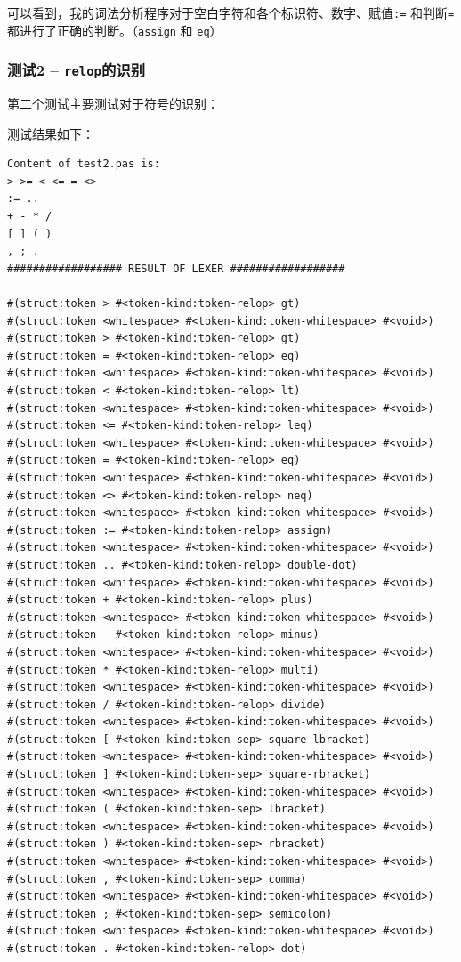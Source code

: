 \documentclass[lang=cn]{elegantpaper}
\begin{document}
可以看到，我的词法分析程序对于空白字符和各个标识符、数字、赋值\lstinline|:=|
和判断\lstinline|=|都进行了正确的判断。（\lstinline|assign| 和 
\lstinline|eq|）

\subsubsection{测试2 -- \lstinline|relop|的识别}

第二个测试主要测试对于符号的识别：



测试结果如下：

\begin{lstlisting}
Content of test2.pas is:
> >= < <= = <> 
:= ..
+ - * /
[ ] ( )
, ; .
################## RESULT OF LEXER ##################

#(struct:token > #<token-kind:token-relop> gt)
#(struct:token <whitespace> #<token-kind:token-whitespace> #<void>)
#(struct:token > #<token-kind:token-relop> gt)
#(struct:token = #<token-kind:token-relop> eq)
#(struct:token <whitespace> #<token-kind:token-whitespace> #<void>)
#(struct:token < #<token-kind:token-relop> lt)
#(struct:token <whitespace> #<token-kind:token-whitespace> #<void>)
#(struct:token <= #<token-kind:token-relop> leq)
#(struct:token <whitespace> #<token-kind:token-whitespace> #<void>)
#(struct:token = #<token-kind:token-relop> eq)
#(struct:token <whitespace> #<token-kind:token-whitespace> #<void>)
#(struct:token <> #<token-kind:token-relop> neq)
#(struct:token <whitespace> #<token-kind:token-whitespace> #<void>)
#(struct:token := #<token-kind:token-relop> assign)
#(struct:token <whitespace> #<token-kind:token-whitespace> #<void>)
#(struct:token .. #<token-kind:token-relop> double-dot)
#(struct:token <whitespace> #<token-kind:token-whitespace> #<void>)
#(struct:token + #<token-kind:token-relop> plus)
#(struct:token <whitespace> #<token-kind:token-whitespace> #<void>)
#(struct:token - #<token-kind:token-relop> minus)
#(struct:token <whitespace> #<token-kind:token-whitespace> #<void>)
#(struct:token * #<token-kind:token-relop> multi)
#(struct:token <whitespace> #<token-kind:token-whitespace> #<void>)
#(struct:token / #<token-kind:token-relop> divide)
#(struct:token <whitespace> #<token-kind:token-whitespace> #<void>)
#(struct:token [ #<token-kind:token-sep> square-lbracket)
#(struct:token <whitespace> #<token-kind:token-whitespace> #<void>)
#(struct:token ] #<token-kind:token-sep> square-rbracket)
#(struct:token <whitespace> #<token-kind:token-whitespace> #<void>)
#(struct:token ( #<token-kind:token-sep> lbracket)
#(struct:token <whitespace> #<token-kind:token-whitespace> #<void>)
#(struct:token ) #<token-kind:token-sep> rbracket)
#(struct:token <whitespace> #<token-kind:token-whitespace> #<void>)
#(struct:token , #<token-kind:token-sep> comma)
#(struct:token <whitespace> #<token-kind:token-whitespace> #<void>)
#(struct:token ; #<token-kind:token-sep> semicolon)
#(struct:token <whitespace> #<token-kind:token-whitespace> #<void>)
#(struct:token . #<token-kind:token-relop> dot)
\end{lstlisting}
\end{document}
